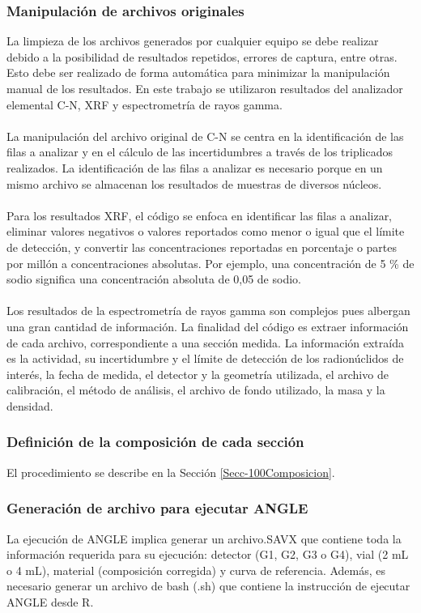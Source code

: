\subsubsection{Manipulación de archivos originales}
La limpieza de los archivos generados por cualquier equipo se debe realizar debido a la posibilidad de resultados repetidos, errores de captura, entre otras. Esto debe ser realizado de forma automática para minimizar la manipulación manual de los resultados. En este trabajo se utilizaron resultados del analizador elemental C-N, XRF y espectrometría de rayos gamma.
\\
\\
La manipulación del archivo original de C-N se centra en la identificación de las filas a analizar y en el cálculo de las incertidumbres a través de los triplicados realizados. La identificación de las filas a analizar es necesario porque en un mismo archivo se almacenan los resultados de muestras de diversos núcleos. 
\\
\\
Para los resultados XRF, el código se enfoca en identificar las filas a analizar, eliminar valores negativos o valores reportados como menor o igual que el límite de detección, y convertir las concentraciones reportadas en porcentaje o partes por millón a concentraciones absolutas. Por ejemplo, una concentración de 5 \% de sodio significa una concentración absoluta de 0,05 de sodio. 
\\
\\
Los resultados de la espectrometría de rayos gamma son complejos pues albergan una gran cantidad de información. La finalidad del código es extraer información de cada archivo, correspondiente a una sección medida. La información extraída es la actividad, su incertidumbre y el límite de detección de los radionúclidos de interés, la fecha de medida, el detector y la geometría utilizada, el archivo de calibración, el método de análisis, el archivo de fondo utilizado, la masa y la densidad. 
\subsubsection{Definición de la composición de cada sección}
El procedimiento se describe en la Sección \ref{Secc-100Composicion}.
\subsubsection{Generación de archivo para ejecutar ANGLE}
La ejecución de ANGLE implica generar un archivo.SAVX que contiene toda la información requerida para su ejecución: detector (G1, G2, G3 o G4), vial (2 mL o 4 mL),  material (composición corregida) y curva de referencia.  Además, es necesario generar un archivo de bash (.sh) que contiene la instrucción de ejecutar ANGLE desde R. 
